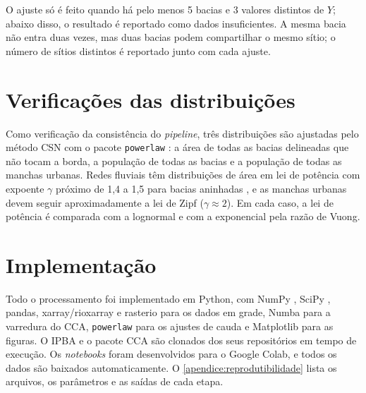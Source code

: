 O ajuste só é feito quando há pelo menos 5 bacias e 3 valores distintos de $Y$; abaixo disso, o resultado é reportado como dados insuficientes. A mesma bacia não entra duas vezes, mas duas bacias podem compartilhar o mesmo sítio; o número de sítios distintos é reportado junto com cada ajuste.

\section{Verificações das distribuições}
\label{sec:met-verificacoes}

Como verificação da consistência do \textit{pipeline}, três distribuições são ajustadas pelo método CSN com o pacote \texttt{powerlaw} \cite{alstott2014}: a área de todas as bacias delineadas que não tocam a borda, a população de todas as bacias e a população de todas as manchas urbanas. Redes fluviais têm distribuições de área em lei de potência com expoente $\gamma$ próximo de 1,4 a 1,5 para bacias aninhadas \cite{rodrigueziturbe1997,maritan1996}, e as manchas urbanas devem seguir aproximadamente a lei de Zipf ($\gamma \approx 2$). Em cada caso, a lei de potência é comparada com a lognormal e com a exponencial pela razão de Vuong.

\section{Implementação}
\label{sec:implementacao}

Todo o processamento foi implementado em Python, com NumPy \cite{harris2020}, SciPy \cite{virtanen2020}, pandas, xarray/rioxarray e rasterio para os dados em grade, Numba \cite{lam2015} para a varredura do CCA, \texttt{powerlaw} \cite{alstott2014} para os ajustes de cauda e Matplotlib \cite{hunter2007} para as figuras. O IPBA \cite{ipba} e o pacote CCA são clonados dos seus repositórios em tempo de execução. Os \textit{notebooks} foram desenvolvidos para o Google Colab, e todos os dados são baixados automaticamente. O \autoref{apendice:reprodutibilidade} lista os arquivos, os parâmetros e as saídas de cada etapa.
